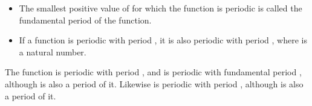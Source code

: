 \EMhold


\begin{EMunit}



\begin{itemize}
\tightlist
\item
  The smallest positive value of  for which the function is periodic is called the fundamental period of the function.
\item
  If a function is periodic with period , it is also periodic with period , where  is a natural number.
\end{itemize}

\end{EMunit}

\EMhold


\begin{EMexample}{}

The function  is periodic with period \EMim{2\pi}, and  is periodic with fundamental period \EMim{\pi}, although \EMim{2\pi} is also a period of it. Likewise  is periodic with period , although \EMim{2\pi} is also a period of it.

\end{EMexample}

\begin{EMunit}


\end{EMunit}

\EMhold


